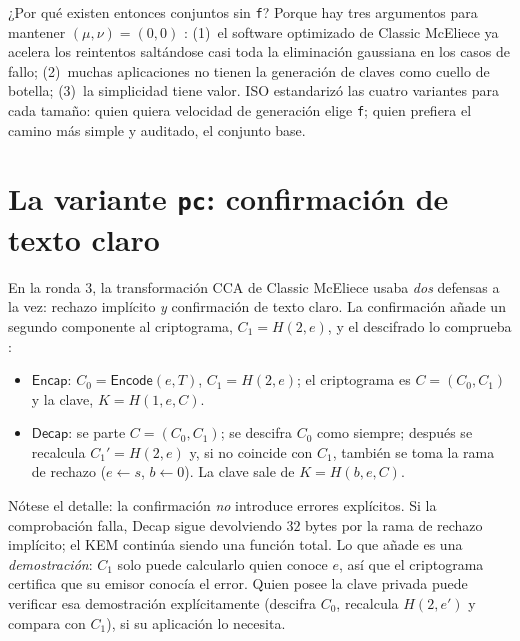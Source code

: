 ¿Por qué existen entonces conjuntos sin \texttt{f}? Porque hay tres
argumentos para mantener $(\mu,\nu)=(0,0)$ \cite{cmrationale}: (1)~el
software optimizado de Classic McEliece ya acelera los reintentos
saltándose casi toda la eliminación gaussiana en los casos de fallo;
(2)~muchas aplicaciones no tienen la generación de claves como cuello
de botella; (3)~la simplicidad tiene valor. ISO estandarizó las
cuatro variantes para cada tamaño: quien quiera velocidad de
generación elige \texttt{f}; quien prefiera el camino más simple y
auditado, el conjunto base.

\section{La variante \texttt{pc}: confirmación de texto claro}\label{sec:param-pc}

En la ronda 3, la transformación CCA de Classic McEliece usaba
\emph{dos} defensas a la vez: rechazo implícito \emph{y} confirmación
de texto claro. La confirmación añade un segundo componente al
criptograma, $C_1=H(2,e)$, y el descifrado lo comprueba
\cite{cmpc}:

\begin{itemize}[leftmargin=1.5em,itemsep=3pt]
  \item $\textsf{Encap}$: $C_0=\textsf{Encode}(e,T)$,
        $C_1=H(2,e)$; el criptograma es $C=(C_0,C_1)$ y la clave,
        $K=H(1,e,C)$.
  \item $\textsf{Decap}$: se parte $C=(C_0,C_1)$; se descifra
        $C_0$ como siempre; después se recalcula $C_1'=H(2,e)$ y, si
        no coincide con $C_1$, también se toma la rama de rechazo
        ($e\leftarrow s$, $b\leftarrow0$). La clave sale de
        $K=H(b,e,C)$.
\end{itemize}

Nótese el detalle: la confirmación \emph{no} introduce errores
explícitos. Si la comprobación falla, \textsf{Decap} sigue devolviendo
$32$ bytes por la rama de rechazo implícito; el KEM continúa siendo
una función total. Lo que añade es una \emph{demostración}: $C_1$ solo
puede calcularlo quien conoce $e$, así que el criptograma certifica
que su emisor conocía el error. Quien posee la clave privada puede
verificar esa demostración explícitamente (descifra $C_0$, recalcula
$H(2,e')$ y compara con $C_1$), si su aplicación lo necesita.

